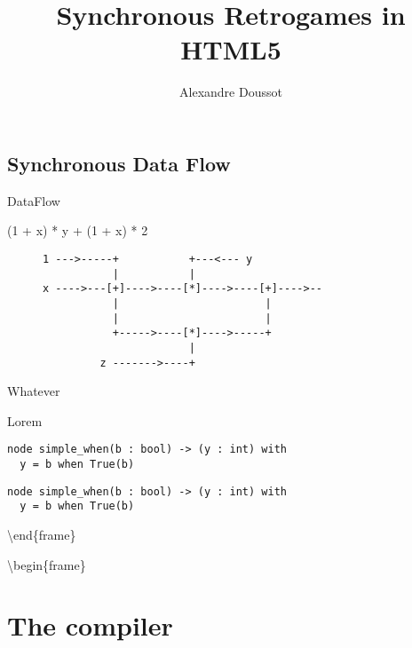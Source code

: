 \documentclass[ignorenonframetext,]{beamer}
\title{Synchronous Retrogames in HTML5}
\author{Alexandre Doussot}
\institute{Université Pierre et Marie Curie}
\date{}
\begin{document}
\frame{\titlepage}

\begin{frame}

\section{Synchronous Data Flow}

\end{frame}

\begin{frame}[fragile]{DataFlow}

\centering

(1 + x) * y + (1 + x) * 2

\begin{figure}[h]
\centering
\begin{BVerbatim}
1 --->-----+           +---<--- y
           |           |
x ---->---[+]---->----[*]---->----[+]---->--
           |                       |
           |                       |
           +----->----[*]---->-----+
                       |
         z ------->----+
\end{BVerbatim}
\end{figure}

\end{frame}

\begin{frame}[fragile]{Whatever}

Lorem

\begin{table}[!h]
\begin{minipage}{0.45\linewidth}
\begin{lstlisting}
node simple_when(b : bool) -> (y : int) with
  y = b when True(b)
\end{lstlisting}
\end{minipage}
\hfill\vrule\hfill
\begin{minipage}{0.45\linewidth}
\begin{lstlisting}
node simple_when(b : bool) -> (y : int) with
  y = b when True(b)
\end{lstlisting}
\end{minipage}
\end{table}

\textbackslash{}end\{frame\}

\textbackslash{}begin\{frame\}

\section{The compiler}

\end{frame}
\end{document}
